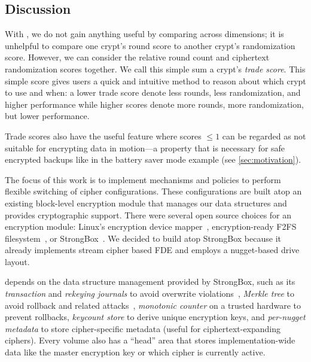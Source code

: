 \subsection{Discussion}\label{subsec:des-discussion}



 With \sysC, we do not gain anything useful by comparing
across dimensions; \ie it is unhelpful to compare one crypt's round score to
another crypt's randomization score. However, we can consider the relative round
count and ciphertext randomization scores together. We call this simple sum a
crypt's {\em trade score}. This simple score gives users a quick and intuitive
method to reason about which crypt to use and when: a lower trade score denote
less rounds, less randomization, and higher performance while higher scores
denote more rounds, more randomization, but lower performance.

Trade scores also have the useful feature where scores $\leq1$ can be regarded
as not suitable for encrypting data in motion---a property that is necessary for
safe encrypted backups like in the battery saver mode example (see
\cref{sec:motivation}).


 The focus of this work is to implement
mechanisms and policies to perform flexible switching of cipher configurations.
These configurations are built atop an existing block-level encryption module
that manages our data structures and provides cryptographic support. There were
several open source choices for an encryption module: Linux's encryption device
mapper~\cite{dmcrypt,DmC-Android}, encryption-ready F2FS filesystem~\cite{F2FS},
or StrongBox~\cite{StrongBox}. We decided to build \sys atop StrongBox because
it already implements stream cipher based FDE and employs a nugget-based drive
layout.

\sys depends on the data structure management provided by StrongBox, such as its
{\em transaction} and {\em rekeying journals} to avoid overwrite
violations~\cite{StrongBox}, {\em Merkle tree} to avoid rollback and related
attacks~\cite{StrongBox}, {\em monotonic counter} on a trusted hardware to
prevent rollbacks, {\em keycount store} to derive unique encryption keys, and
{\em per-nugget metadata} to store cipher-specific metadata (useful for
ciphertext-expanding ciphers). Every \sys volume also has a ``head'' area that
stores implementation-wide data like the master encryption key or which cipher
is currently active.

